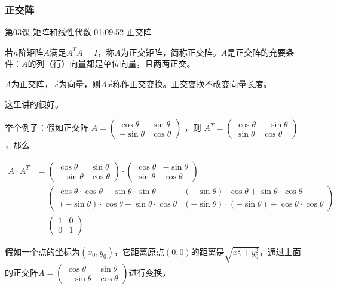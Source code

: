 \documentclass[UTF8]{ctexbook}
\begin{document}
\subsubsection{正交阵}

第03课 矩阵和线性代数 01:09:52 正交阵

若$n$阶矩阵$A$满足$A^{T}A=I$，称$A$为正交矩阵，简称正交阵。$A$是正交阵的充要条件：$A$的列（行）向量都是单位向量，且两两正交。

$A$为正交阵，$\vec{x}$为向量，则$A\vec{x}$称作正交变换。正交变换不改变向量长度。

这里讲的很好。

举个例子：假如正交阵
$A=\begin{pmatrix} \cos \theta & \sin \theta \\ -\sin \theta & \cos \theta \end{pmatrix}$
，则
$A^{T}=\begin{pmatrix} \cos \theta & -\sin \theta \\ \sin \theta & \cos \theta \end{pmatrix}$
，那么

\begin{equation}
\begin{aligned}
A \cdot A^{T}&=\begin{pmatrix} \cos \theta & \sin \theta \\ -\sin \theta & \cos \theta \end{pmatrix} \cdot \begin{pmatrix} \cos \theta & -\sin \theta \\ \sin \theta & \cos \theta \end{pmatrix} \\
&=
\begin{pmatrix}
\cos \theta \cdot \cos \theta + \sin \theta \cdot \sin \theta & (-\sin \theta) \cdot \cos \theta + \sin \theta \cdot \cos \theta \\
(-\sin \theta) \cdot \cos \theta + \sin \theta \cdot \cos \theta & (-\sin \theta) \cdot (-\sin \theta) + \cos \theta \cdot \cos \theta
\end{pmatrix} \\
&=\begin{pmatrix} 1 & 0 \\ 0 & 1 \end{pmatrix}
\end{aligned}
\end{equation}

假如一个点的坐标为$(x_{0},y_{0})$，它距离原点$(0,0)$的距离是$\sqrt{x_{0}^{2}+y_{0}^{2}}$，通过上面的正交阵$A=\begin{pmatrix} \cos \theta & \sin \theta \\ -\sin \theta & \cos \theta \end{pmatrix}$进行变换，
\end{document}
